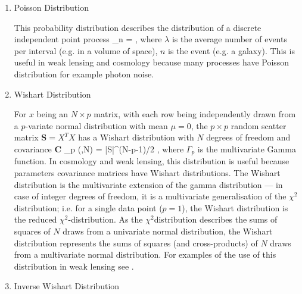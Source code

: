 {\begin{enumerate}
For $x_{n}$ is drawn from `standard' normal distribution, then $X=\sum_{n}^{N}x_{n}^{2}$ has a $\chi^{2}$ distribution with $N$ degrees of freedom
\be
\chi_{N}^{2}\left(X\right)=\left(\right)^{1/2}X^{N/2-1}\exp{} \ ,\label{eq:chi2_dist}
\ee
where $\Gamma(N/2)$ is Gamma function. If $x_{n}$ has mean $\mu$ and variance $\sigma^{2}$ then $X=\frac{1}{\sigma^{2}}\sum_{n}^{N}\left(x_{n}-\mu\right)^2$ has a $\chi^{2}$ distribution with $\left(N-1\right)$ degrees of freedom.
\\
\item Poisson Distribution 

This probability distribution describes the distribution of a discrete independent point process
\be
{}_n =  \exp{(-\lambda)} \; ,
\ee
where $\lambda$ is the average number of events per interval (e.g. in a volume of space), $n$ is the event (e.g. a galaxy). 
This is useful in weak lensing and cosmology because many processes have Poisson distribution for example 
photon noise. 
\\
\item Wishart Distribution

For $x$ being an $N\times p$ matrix, with each row being independently drawn from a $p$-variate normal distribution with mean $\mu=0$, 
the $p\times p$ random scatter matrix $\mathbf{S}=X^TX$ has a Wishart distribution with $N$ degrees of freedom and covariance $\mathbf{C}$
\be
{}_p \left(,N\right) = 
\left|S\right|^{(N-p-1)/2}
\exp{}\; ,
\label{eq:Wishart_dist}
\ee
where $\Gamma_p$ is the multivariate Gamma function. 
In cosmology and weak lensing, this distribution is useful because parameters covariance matrices have Wishart distributions.
 The Wishart distribution is the multivariate extension of the gamma distribution --- in case of integer degrees of freedom, 
it is a multivariate generalisation of the $\chi^2$distribution; i.e. for a single data point ($p=1$), 
the Wishart distribution is the reduced $\chi^2$-distribution. As the $\chi^2$distribution describes the sums 
of squares of $N$ draws from a univariate normal distribution, the Wishart distribution represents the sums 
of squares (and cross-products) of $N$ draws from a multivariate normal distribution. For examples of the use of this distribution in 
weak lensing see \cite{2013MNRAS.432.1928T,2014IAUS..306...99J}. 
\\
\item Inverse Wishart Distribution


\end{enumerate}}
